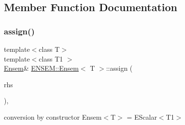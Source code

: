 \subsection{Member Function Documentation}
\mbox{\label{classENSEM_1_1Ensem_aa09448269bc5b72687905254739bf69a}} 
\subsubsection{\texorpdfstring{assign()}{assign()}\hspace{0.1cm}{\footnotesize\ttfamily [1/12]}}
{\footnotesize\ttfamily template$<$class T$>$ \\
template$<$class T1 $>$ \\
\mbox{\hyperlink{classENSEM_1_1Ensem}{Ensem}}\& \mbox{\hyperlink{classENSEM_1_1Ensem}{E\+N\+S\+E\+M\+::\+Ensem}}$<$ T $>$\+::assign (\begin{DoxyParamCaption}\item[{const \mbox{\hyperlink{classENSEM_1_1EScalar}{E\+Scalar}}$<$ T1 $>$ \&}]{rhs }\end{DoxyParamCaption})\hspace{0.3cm}{\ttfamily [inline]}, {\ttfamily [protected]}}



conversion by constructor Ensem$<$\+T$>$ = E\+Scalar$<$\+T1$>$ 


